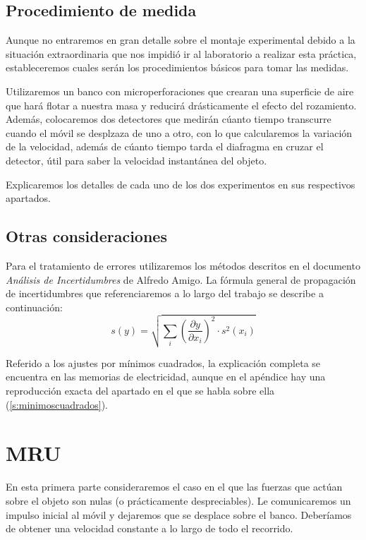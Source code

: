 \documentclass[12pt, a4paper, titlepage]{article}
\begin{document}
  \subsection{Procedimiento de medida}

  Aunque no entraremos en gran detalle sobre el montaje experimental debido a la situación extraordinaria que nos impidió ir al laboratorio a realizar esta práctica, estableceremos cuales serán los procedimientos básicos para tomar las medidas.

  Utilizaremos un banco con microperforaciones que crearan una superficie de aire que hará flotar a nuestra masa y reducirá drásticamente el efecto del rozamiento. Además, colocaremos dos detectores que medirán cúanto tiempo transcurre cuando el móvil se desplzaza de uno a otro, con lo que calcularemos la variación de la velocidad, además de cúanto tiempo tarda el diafragma en cruzar el detector, útil para saber la velocidad instantánea del objeto.

  Explicaremos los detalles de cada uno de los dos experimentos en sus respectivos apartados.

  \subsection{Otras consideraciones}

  Para el tratamiento de errores utilizaremos los métodos descritos en el documento \textit{Análisis de Incertidumbres} de Alfredo Amigo. La fórmula general de propagación de incertidumbres que referenciaremos a lo largo del trabajo se describe a continuación:
  \begin{equation}
    s(y) = \sqrt{\sum_i{\left( \frac{\partial y}{\partial x_i} \right)^2 \cdot s^2(x_i)}} \label{ec:sy}
  \end{equation}

  Referido a los ajustes por mínimos cuadrados, la explicación completa se encuentra en las memorias de electricidad, aunque en el apéndice hay una reproducción exacta del apartado en el que se habla sobre ella (\ref{s:minimoscuadrados}).

  \newpage
  \section{MRU}

  En esta primera parte consideraremos el caso en el que las fuerzas que actúan sobre el objeto son nulas (o prácticamente despreciables). Le comunicaremos un impulso inicial al móvil y dejaremos que se desplace sobre el banco. Deberíamos de obtener una velocidad constante a lo largo de todo el recorrido.
\end{document}
